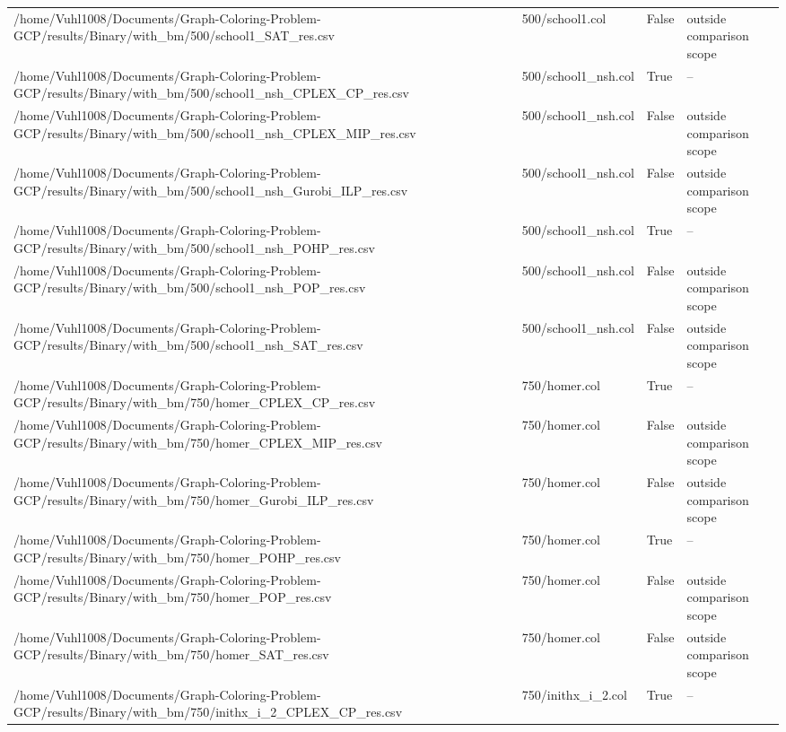 \begin{table}[htbp]
\begin{tabular}{llll}
/home/Vuhl1008/Documents/Graph-Coloring-Problem-GCP/results/Binary/with\_bm/500/school1\_SAT\_res.csv & 500/school1.col & False & outside comparison scope \\
/home/Vuhl1008/Documents/Graph-Coloring-Problem-GCP/results/Binary/with\_bm/500/school1\_nsh\_CPLEX\_CP\_res.csv & 500/school1\_nsh.col & True & -- \\
/home/Vuhl1008/Documents/Graph-Coloring-Problem-GCP/results/Binary/with\_bm/500/school1\_nsh\_CPLEX\_MIP\_res.csv & 500/school1\_nsh.col & False & outside comparison scope \\
/home/Vuhl1008/Documents/Graph-Coloring-Problem-GCP/results/Binary/with\_bm/500/school1\_nsh\_Gurobi\_ILP\_res.csv & 500/school1\_nsh.col & False & outside comparison scope \\
/home/Vuhl1008/Documents/Graph-Coloring-Problem-GCP/results/Binary/with\_bm/500/school1\_nsh\_POHP\_res.csv & 500/school1\_nsh.col & True & -- \\
/home/Vuhl1008/Documents/Graph-Coloring-Problem-GCP/results/Binary/with\_bm/500/school1\_nsh\_POP\_res.csv & 500/school1\_nsh.col & False & outside comparison scope \\
/home/Vuhl1008/Documents/Graph-Coloring-Problem-GCP/results/Binary/with\_bm/500/school1\_nsh\_SAT\_res.csv & 500/school1\_nsh.col & False & outside comparison scope \\
/home/Vuhl1008/Documents/Graph-Coloring-Problem-GCP/results/Binary/with\_bm/750/homer\_CPLEX\_CP\_res.csv & 750/homer.col & True & -- \\
/home/Vuhl1008/Documents/Graph-Coloring-Problem-GCP/results/Binary/with\_bm/750/homer\_CPLEX\_MIP\_res.csv & 750/homer.col & False & outside comparison scope \\
/home/Vuhl1008/Documents/Graph-Coloring-Problem-GCP/results/Binary/with\_bm/750/homer\_Gurobi\_ILP\_res.csv & 750/homer.col & False & outside comparison scope \\
/home/Vuhl1008/Documents/Graph-Coloring-Problem-GCP/results/Binary/with\_bm/750/homer\_POHP\_res.csv & 750/homer.col & True & -- \\
/home/Vuhl1008/Documents/Graph-Coloring-Problem-GCP/results/Binary/with\_bm/750/homer\_POP\_res.csv & 750/homer.col & False & outside comparison scope \\
/home/Vuhl1008/Documents/Graph-Coloring-Problem-GCP/results/Binary/with\_bm/750/homer\_SAT\_res.csv & 750/homer.col & False & outside comparison scope \\
/home/Vuhl1008/Documents/Graph-Coloring-Problem-GCP/results/Binary/with\_bm/750/inithx\_i\_2\_CPLEX\_CP\_res.csv & 750/inithx\_i\_2.col & True & -- \\

\end{tabular}
\end{table}
